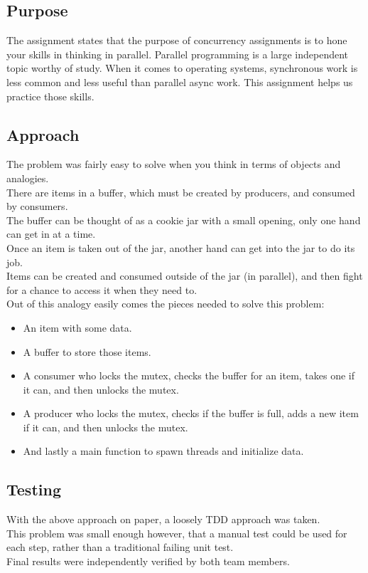 \documentclass[letterpaper,10pt,fleqn]{article}
\begin{document}
	\subsection*{Purpose}
	The assignment states that the purpose of concurrency assignments is to hone your skills in thinking in parallel.
	Parallel programming is a large independent topic worthy of study.
	When it comes to operating systems, synchronous work is less common and less useful than parallel async work.
	This assignment helps us practice those skills.
	\subsection*{Approach}
	The problem was fairly easy to solve when you think in terms of objects and analogies.
	\\There are items in a buffer, which must be created by producers, and consumed by consumers.
	\\The buffer can be thought of as a cookie jar with a small opening, only one hand can get in at a time.
	\\Once an item is taken out of the jar, another hand can get into the jar to do its job.
	\\Items can be created and consumed outside of the jar (in parallel), and then fight for a chance to access it when they need to.
	\\Out of this analogy easily comes the pieces needed to solve this problem:
	\begin{itemize}
		\item An item with some data.
		\item A buffer to store those items.
		\item A consumer who locks the mutex, checks the buffer for an item, takes one if it can, and then unlocks the mutex.
		\item A producer who locks the mutex, checks if the buffer is full, adds a new item if it can, and then unlocks the mutex.
		\item And lastly a main function to spawn threads and initialize data.
	\end{itemize}
	\subsection*{Testing}
	With the above approach on paper, a loosely TDD approach was taken.
	\\This problem was small enough however, that a manual test could be used for each step, rather than a traditional failing unit test.
	\\Final results were independently verified by both team members.
\end{document}
